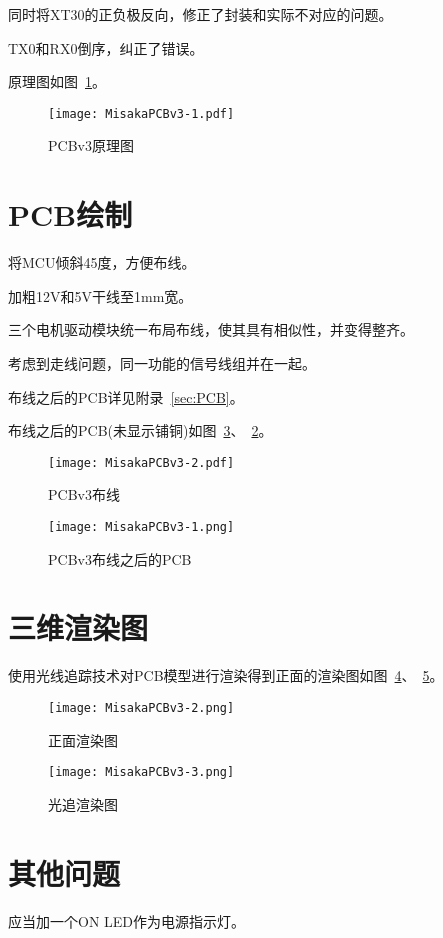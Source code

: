 同时将XT30的正负极反向，修正了封装和实际不对应的问题。

TX0和RX0倒序，纠正了错误。

原理图如图~\ref{fig:MisakaPCBv3-sch}。

\begin{figure}[htbp]
    \centering
    \texttt{[image: MisakaPCBv3-1.pdf]}
    \caption{PCBv3原理图}
    \label{fig:MisakaPCBv3-sch}
\end{figure}

\section{PCB绘制}

将MCU倾斜45度，方便布线。

加粗12V和5V干线至1mm宽。

三个电机驱动模块统一布局布线，使其具有相似性，并变得整齐。

考虑到走线问题，同一功能的信号线组并在一起。

布线之后的PCB详见附录~\ref{sec:PCB}。

布线之后的PCB(未显示铺铜)如图~\ref{fig:MisakaPCBv3-1}、~\ref{fig:MisakaPCBv3}。

\begin{figure}[htbp]
    \centering
    \texttt{[image: MisakaPCBv3-2.pdf]}
    \caption{PCBv3布线}
    \label{fig:MisakaPCBv3}
\end{figure}

\begin{figure}[htbp]
    \centering
    \texttt{[image: MisakaPCBv3-1.png]}
    \caption{PCBv3布线之后的PCB}
    \label{fig:MisakaPCBv3-1}
\end{figure}

\section{三维渲染图}

使用光线追踪技术对PCB模型进行渲染得到正面的渲染图如图~\ref{fig:MisakaPCBv3-2}、~\ref{fig:MisakaPCBv3-3}。

\begin{figure}[htbp]
    \centering
    \texttt{[image: MisakaPCBv3-2.png]}
    \caption{正面渲染图}
    \label{fig:MisakaPCBv3-2}
\end{figure}

\begin{figure}[htbp]
    \centering
    \texttt{[image: MisakaPCBv3-3.png]}
    \caption{光追渲染图}
    \label{fig:MisakaPCBv3-3}
\end{figure}

\section{其他问题}

应当加一个ON LED作为电源指示灯。
